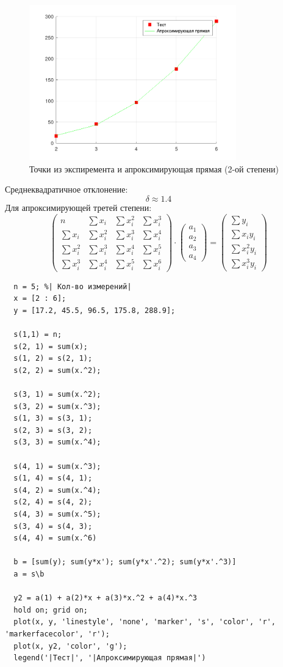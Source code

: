 \begin{figure}[H]
  \caption{Точки из экспиремента и апроксимирующая прямая (2-ой степени)}
  \label{fig:plot_7_2}
  \centering
  \includegraphics[width=0.8\textwidth]{images/task_7_2.png}
\end{figure}
Среднеквадратичное отклонение:
\[
  \delta \approx 1.4
\]
Для апроксимирующей третей степени:
\[
  \begin{pmatrix}
    n & \sum x_{i} & \sum x_{i}^{2} & \sum x_{i}^{3} \\[1em]
    \sum x_{i} & \sum x_{i}^{2} & \sum x_{i}^{3} & \sum x_{i}^{4} \\[1em]
    \sum x_{i}^{2} & \sum x_{i}^{3} & \sum x_{i}^{4} & \sum x_{i}^{5} \\[1em]
    \sum x_{i}^{3} & \sum x_{i}^{4} & \sum x_{i}^{5} & \sum x_{i}^{6}
  \end{pmatrix}
  \cdot
  \begin{pmatrix}
    a_{1}\\[1em]
    a_{2}\\[1em]
    a_{3}\\[1em]
    a_{4}
  \end{pmatrix}
  =
  \begin{pmatrix}
    \sum y_{i} \\[1em]
    \sum x_{i}y_{i} \\[1em]
    \sum x_{i}^{2}y_{i} \\[1em]
    \sum x_{i}^{3}y_{i}
  \end{pmatrix}
\]
\begin{lstlisting}
  n = 5; %| Кол-во измерений|
  x = [2 : 6];
  y = [17.2, 45.5, 96.5, 175.8, 288.9];

  s(1,1) = n;
  s(2, 1) = sum(x);
  s(1, 2) = s(2, 1);
  s(2, 2) = sum(x.^2);

  s(3, 1) = sum(x.^2);
  s(3, 2) = sum(x.^3);
  s(1, 3) = s(3, 1);
  s(2, 3) = s(3, 2);
  s(3, 3) = sum(x.^4);

  s(4, 1) = sum(x.^3);
  s(1, 4) = s(4, 1);
  s(4, 2) = sum(x.^4);
  s(2, 4) = s(4, 2);
  s(4, 3) = sum(x.^5);
  s(3, 4) = s(4, 3);
  s(4, 4) = sum(x.^6)

  b = [sum(y); sum(y*x'); sum(y*x'.^2); sum(y*x'.^3)]
  a = s\b

  y2 = a(1) + a(2)*x + a(3)*x.^2 + a(4)*x.^3
  hold on; grid on;
  plot(x, y, 'linestyle', 'none', 'marker', 's', 'color', 'r', 'markerfacecolor', 'r');
  plot(x, y2, 'color', 'g');
  legend('|Тест|', '|Апроксимирующая прямая|')
\end{lstlisting}
